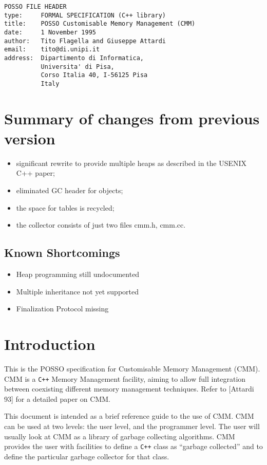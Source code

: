 \def\theenumi{\alph{enumi}}
\def\labelenumi{(\alph{enumi})}
\pagestyle{myheadings}

\begin{verbatim}
POSSO FILE HEADER
type:     FORMAL SPECIFICATION (C++ library)
title:    POSSO Customisable Memory Management (CMM)
date:     1 November 1995
author:   Tito Flagella and Giuseppe Attardi
email:    tito@di.unipi.it
address:  Dipartimento di Informatica,
          Universita' di Pisa,
          Corso Italia 40, I-56125 Pisa
          Italy
\end{verbatim}

\section{Summary of changes from previous version}
\begin{itemize}
\item significant rewrite to provide multiple heaps as described in the
USENIX C++ paper;
\item eliminated GC header for objects;
\item the space for tables is recycled;
\item the collector consists of just two files cmm.h, cmm.cc.
\end{itemize}

\subsection {Known Shortcomings}
\begin{itemize}
\item Heap programming still undocumented
\item Multiple inheritance not yet supported
\item Finalization Protocol missing
\end{itemize}

\section{Introduction}

This is the POSSO specification for Customisable Memory Management (CMM).  CMM
is a {\tt C++} Memory Management facility, aiming to allow full integration
between coexisting different memory management techniques.  Refer to [Attardi
93] for a detailed paper on CMM.

This document is intended as a brief reference guide to the use of CMM.  CMM
can be used at two levels: the user level, and the programmer level.  The user
will usually look at CMM as a library of garbage collecting algorithms.  CMM
provides the user with facilities to define a {\tt C++} class as ``garbage
collected'' and to define the particular garbage collector for that class.

